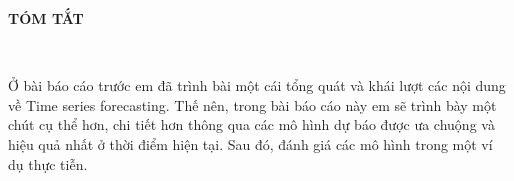 \newpage
\changefontsizes{16pt}
\centerline{\textbf{TÓM TẮT}}\

\changefontsizes{13pt}
\setlength{\parindent}{0em}
Ở bài báo cáo trước em đã trình bài một cái tổng quát và khái lượt các nội dung về Time series forecasting. Thế nên, trong bài báo cáo này em sẽ trình bày một chút cụ thể hơn, chi tiết hơn thông qua các mô hình dự báo được ưa chuộng và hiệu quả nhất ở thời điểm hiện tại. Sau đó, đánh giá các mô hình trong một ví dụ thực tiễn.